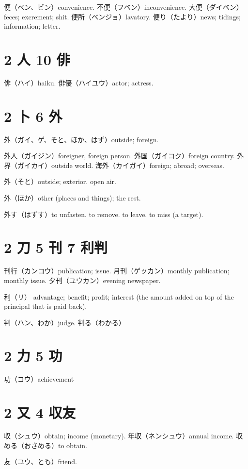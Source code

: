 便（ベン、ビン）convenience.
不便（フベン）inconvenience.
大便（ダイベン）feces; excrement; shit.
便所（ベンジョ）lavatory.
便り（たより）news; tidings; information; letter.

\section{2 人 10 俳}

俳（ハイ）haiku.
俳優（ハイユウ）actor; actress.

\section{2 卜 6 外}

外（ガイ、ゲ、そと、ほか、はず）outside; foreign.

外人（ガイジン）foreigner, foreign person.
外国（ガイコク）foreign country.
外界（ガイカイ）outside world.
海外（カイガイ）foreign; abroad; overseas.

外（そと）outside; exterior. open air.

外（ほか）other (places and things); the rest.

外す（はずす）to unfasten. to remove. to leave. to miss (a target).

\section{2 刀 5 刊 7 利判}

刊行（カンコウ）publication; issue.
月刊（ゲッカン）monthly publication; monthly issue.
夕刊（ユウカン）evening newspaper.

利（リ）
advantage; benefit; profit;
interest (the amount added on top of the principal that is paid back).

判（ハン、わか）judge.
判る（わかる）

\section{2 力 5 功}

功（コウ）achievement

\section{2 又 4 収友}

収（シュウ）obtain; income (monetary).
年収（ネンシュウ）annual income.
収める（おさめる）to obtain.

友（ユウ、とも）friend.

